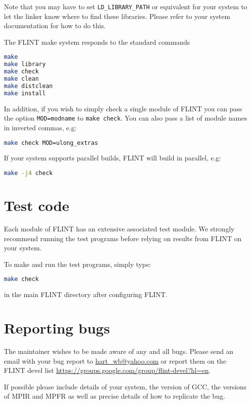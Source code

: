 \documentclass[a4paper,10pt]{book}
\newcommand{\code}{\lstinline}
\begin{document}
Note that you may have to set \code{LD_LIBRARY_PATH} or equivalent
for your system to let the linker know where to find these libraries.
Please refer to your system documentation for how to do this.

The FLINT make system responds to the standard commands
\begin{lstlisting}[language=bash]
make 
make library
make check
make clean
make distclean
make install
\end{lstlisting}

In addition, if you wish to simply check a single module of FLINT you
can pass the option \code{MOD=modname} to \code{make check}. You can 
also pass a list of module names in inverted commas, e.g:

\begin{lstlisting}[language=bash]
make check MOD=ulong_extras
\end{lstlisting}

If your system supports parallel builds, FLINT will build in parallel,
e.g:
\begin{lstlisting}[language=bash]
make -j4 check 
\end{lstlisting}

\chapter{Test code}

Each module of FLINT has an extensive associated test module.  We 
strongly recommend running the test programs before relying on results 
from FLINT on your system. 

To make and run the test programs, simply type:
\begin{lstlisting}[language=bash]
make check
\end{lstlisting}

in the main FLINT directory after configuring FLINT.

\chapter{Reporting bugs}

The maintainer wishes to be made aware of any and all bugs.  Please send an 
email with your bug report to \url{hart_wb@yahoo.com} or report them on the
FLINT devel list \url{https://groups.google.com/group/flint-devel?hl=en}.

If possible please include details of your system, the version of GCC, 
the versions of MPIR and MPFR as well as precise details of how to 
replicate the bug.
\end{document}

